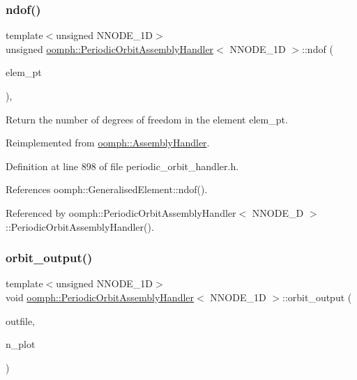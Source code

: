 \subsubsection{\texorpdfstring{ndof()}{ndof()}}
{\footnotesize\ttfamily template$<$unsigned N\+N\+O\+D\+E\+\_\+1D$>$ \\
unsigned \hyperlink{classoomph_1_1PeriodicOrbitAssemblyHandler}{oomph\+::\+Periodic\+Orbit\+Assembly\+Handler}$<$ N\+N\+O\+D\+E\+\_\+1D $>$\+::ndof (\begin{DoxyParamCaption}\item[{\hyperlink{classoomph_1_1GeneralisedElement}{Generalised\+Element} $\ast$const \&}]{elem\+\_\+pt }\end{DoxyParamCaption})\hspace{0.3cm}{\ttfamily [inline]}, {\ttfamily [virtual]}}



Return the number of degrees of freedom in the element elem\+\_\+pt. 



Reimplemented from \hyperlink{classoomph_1_1AssemblyHandler_a09213be8f4aa009e0366460a7ed78e68}{oomph\+::\+Assembly\+Handler}.



Definition at line 898 of file periodic\+\_\+orbit\+\_\+handler.\+h.



References oomph\+::\+Generalised\+Element\+::ndof().



Referenced by oomph\+::\+Periodic\+Orbit\+Assembly\+Handler$<$ N\+N\+O\+D\+E\+\_\+D $>$\+::\+Periodic\+Orbit\+Assembly\+Handler().

\mbox{\label{classoomph_1_1PeriodicOrbitAssemblyHandler_a51b7db6467c46b417b3e630d0ef96a8f}} 
\subsubsection{\texorpdfstring{orbit\+\_\+output()}{orbit\_output()}}
{\footnotesize\ttfamily template$<$unsigned N\+N\+O\+D\+E\+\_\+1D$>$ \\
void \hyperlink{classoomph_1_1PeriodicOrbitAssemblyHandler}{oomph\+::\+Periodic\+Orbit\+Assembly\+Handler}$<$ N\+N\+O\+D\+E\+\_\+1D $>$\+::orbit\+\_\+output (\begin{DoxyParamCaption}\item[{std\+::ostream \&}]{outfile,  }\item[{const unsigned \&}]{n\+\_\+plot }\end{DoxyParamCaption})\hspace{0.3cm}{\ttfamily [inline]}}



